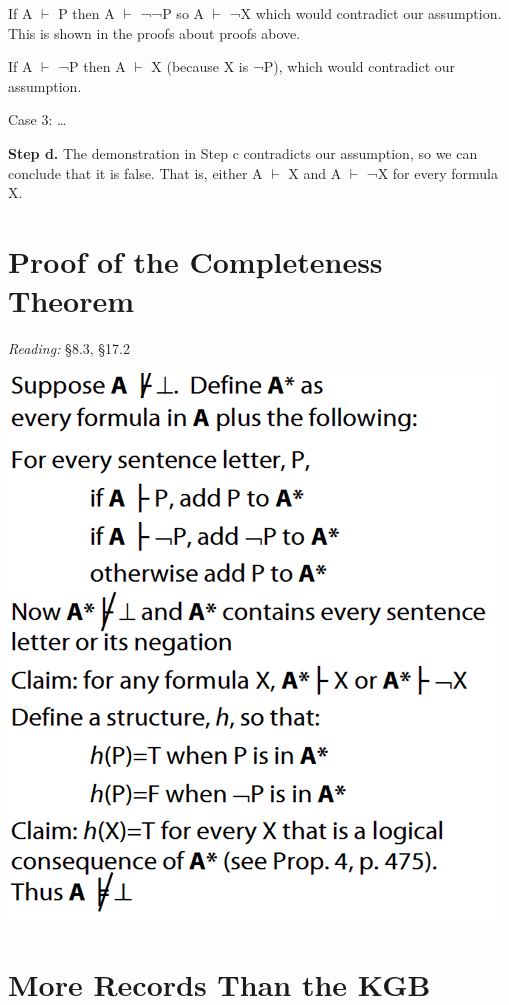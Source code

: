 \documentclass[12pt]{extarticle}
\begin{document}
\begin{multicols*}{3}
\hspace{5mm} If A $\vdash$ P then A $\vdash$ ¬¬P so A $\vdash$ ¬X which would contradict our assumption. This is shown in the proofs about proofs above.
 
\hspace{5mm} If A $\vdash$ ¬P then A $\vdash$ X (because X is ¬P), which would contradict our assumption.
 
Case 3: …
 
\textbf{Step d.} The demonstration in Step c contradicts our assumption, so we can conclude that it is false. That is, either A $\vdash$ X and A $\vdash$ ¬X for every formula X.
 
 
 
\section{Proof of the Completeness Theorem}
 
\emph{Reading:} §8.3, §17.2
 
\begin{center}
\includegraphics[scale=0.3]{img/unit_455_completeness.png}
\end{center}
 
 
\section{More Records Than the KGB}
 

\end{multicols*}
\end{document}
